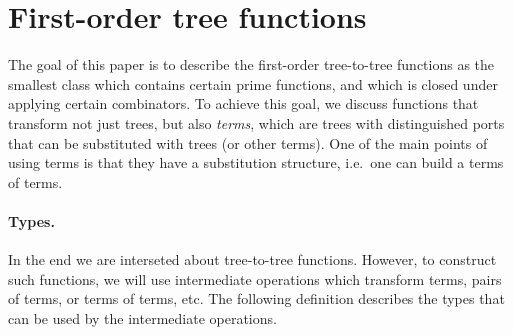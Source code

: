 
\section{First-order tree functions}
The goal of this paper is to describe the first-order tree-to-tree functions as the smallest class which contains certain prime functions, and which is closed under applying certain combinators. To achieve this goal, we discuss functions that transform not just trees, but also \emph{terms}, which are trees with distinguished ports that can be substituted with trees (or other terms). One of the main points of using terms is that  they have a substitution structure, i.e.~one can build a terms of terms. 

\paragraph*{Types.} In the end we are interseted about tree-to-tree functions. However, to construct such functions, we will use intermediate operations which transform terms,  pairs of terms, or terms of terms, etc.
 The following definition describes the types that can be used by the intermediate operations.



